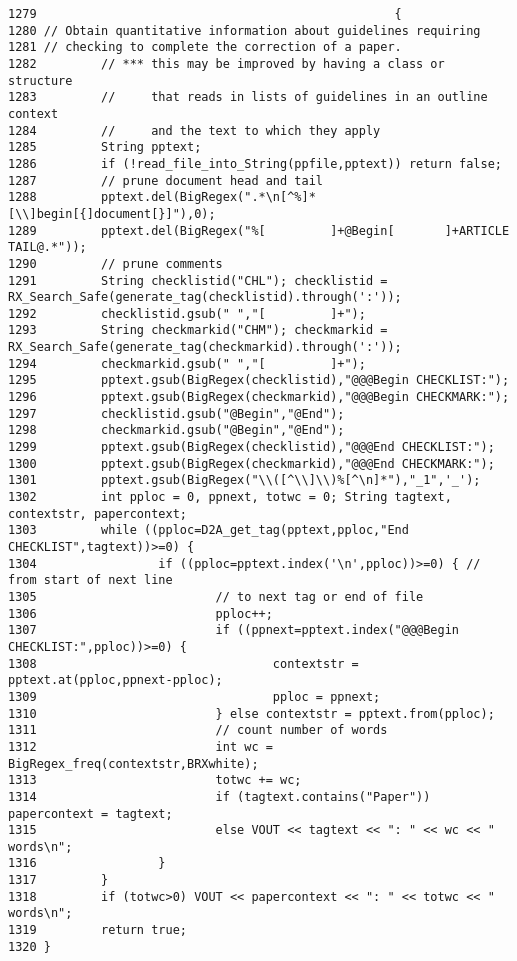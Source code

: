 \footnotesize\begin{verbatim}1279                                                  {
1280 // Obtain quantitative information about guidelines requiring
1281 // checking to complete the correction of a paper.
1282         // *** this may be improved by having a class or structure
1283         //     that reads in lists of guidelines in an outline context
1284         //     and the text to which they apply
1285         String pptext;
1286         if (!read_file_into_String(ppfile,pptext)) return false;
1287         // prune document head and tail
1288         pptext.del(BigRegex(".*\n[^%]*[\\]begin[{]document[}]"),0);
1289         pptext.del(BigRegex("%[         ]+@Begin[       ]+ARTICLE TAIL@.*"));
1290         // prune comments
1291         String checklistid("CHL"); checklistid = RX_Search_Safe(generate_tag(checklistid).through(':'));
1292         checklistid.gsub(" ","[         ]+");
1293         String checkmarkid("CHM"); checkmarkid = RX_Search_Safe(generate_tag(checkmarkid).through(':'));
1294         checkmarkid.gsub(" ","[         ]+");
1295         pptext.gsub(BigRegex(checklistid),"@@@Begin CHECKLIST:");
1296         pptext.gsub(BigRegex(checkmarkid),"@@@Begin CHECKMARK:");
1297         checklistid.gsub("@Begin","@End");
1298         checkmarkid.gsub("@Begin","@End");
1299         pptext.gsub(BigRegex(checklistid),"@@@End CHECKLIST:");
1300         pptext.gsub(BigRegex(checkmarkid),"@@@End CHECKMARK:");
1301         pptext.gsub(BigRegex("\\([^\\]\\)%[^\n]*"),"_1",'_');
1302         int pploc = 0, ppnext, totwc = 0; String tagtext, contextstr, papercontext;
1303         while ((pploc=D2A_get_tag(pptext,pploc,"End CHECKLIST",tagtext))>=0) {
1304                 if ((pploc=pptext.index('\n',pploc))>=0) { // from start of next line
1305                         // to next tag or end of file
1306                         pploc++;
1307                         if ((ppnext=pptext.index("@@@Begin CHECKLIST:",pploc))>=0) {
1308                                 contextstr = pptext.at(pploc,ppnext-pploc);
1309                                 pploc = ppnext;
1310                         } else contextstr = pptext.from(pploc);
1311                         // count number of words
1312                         int wc = BigRegex_freq(contextstr,BRXwhite);
1313                         totwc += wc;
1314                         if (tagtext.contains("Paper")) papercontext = tagtext;
1315                         else VOUT << tagtext << ": " << wc << " words\n";
1316                 }
1317         }
1318         if (totwc>0) VOUT << papercontext << ": " << totwc << " words\n";
1319         return true;
1320 }
\end{verbatim}\normalsize 
{}
